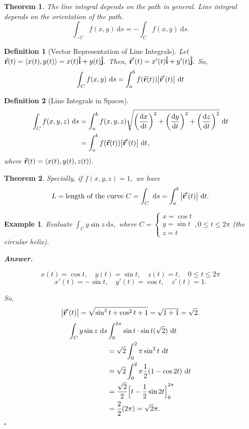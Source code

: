 \documentclass[12pt,a4paper]{article}
\newtheorem{thm}{Theorem}[subsection]
\newtheorem{df}{Definition}[subsection]
\newtheorem{eg}{Example}[subsection]
\newenvironment*{ans}{\par\indent\textbf{\textit{Answer. }}\par}{\par\hfill{$\square$}\par}
\def\dsst{\displaystyle}
\def\d{{\mathrm{d}}}
\def\ds{\d s}
\def\dt{\d t}
\def\intC{\dsst\int_C}
\def\vecr{\va{{\textbf{r}}}}
\def\veci{\vu{\boldsymbol{\textbf{i}}}}
\def\vecj{\vu{\boldsymbol{\textbf{j}}}}
\begin{document}
\begin{thm}
	The line integral depends on the path in general. Line integral depends on the orientation of the path.
	\[\int_{-C} f(x,y)\ \ds=-\intC f(x,y)\ \ds.\]	
\end{thm}
\begin{df}[Vector Representation of Line Integrals]
	Let $\vecr(t)=\langle x(t), y(t)\rangle=x(t)\veci+y(t)\vecj.$ Then, $\vecr'(t)=x'(t)\veci+y'(t)\vecj.$ So, \[\intC f(x,y)\ \ds=\int_a^b f(\vecr(t))\qty|\vecr'(t)|\ \dt\]	
\end{df}
\begin{df}[Line Integrals in Spaces]
	\[\begin{aligned}\intC f(x,y,z)\ \ds&=\int_a^b f(x,y,z)\sqrt{\qty(\dv{x}{t})^2+\qty(\dv{y}{t})^2+\qty(\dv{z}{t})^2}\ \dt\\&=\int_a^b f(\vecr(t))\qty|\vecr'(t)|\ \dt,\end{aligned}\] where $\vecr(t)=\langle x(t),y(t), z(t)\rangle.$
\end{df}
\begin{thm}
	Specially, if $f(x,y,z)=1,$ we have \[L=\text{length of the curve }C=\intC\ \ds=\int_a^b\qty|\vecr'(t)|\ \dt.\]	
\end{thm}
\begin{eg}
	Evaluate $\intC y\sin{z}\ \ds,$ where $C=\begin{cases}x=\cos{t}\\y=\sin{t}\\z=t\end{cases}, 0\leq t\leq2\pi$ (the circular helix).
	\begin{ans}
		\[x(t)=\cos{t},\quad y(t)=\sin{t},\quad z(t)=t,\quad 0\leq t\leq2\pi\] \[x'(t)=-\sin{t},\quad y'(t)=\cos{t},\quad z'(t)=1.\]\par So, \[\qty|\vecr'(t)|=\sqrt{\sin^2t+\cos^2t+1}=\sqrt{1+1}=\sqrt{2}.\]\[\begin{aligned}\intC y\sin{z}\ \ds&\int_0^{2\pi}\sin{t}\cdot\sin{t}(\sqrt{2})\ \dt\\&=\sqrt{2}\int_0^2\pi\sin^2t\ \dt\\&=\sqrt{2}\int_0^2\pi\dfrac{1}{2}(1-\cos{2t})\ \dt\\&=\dfrac{\sqrt{2}}{2}\qty\Big[t-\dfrac{1}{2}\sin{2t}]_0^{2\pi}\\&=\dfrac{2}{2}(2\pi)=\sqrt{2}\pi.\end{aligned}\]
	\end{ans}
\end{eg}
\end{document}
